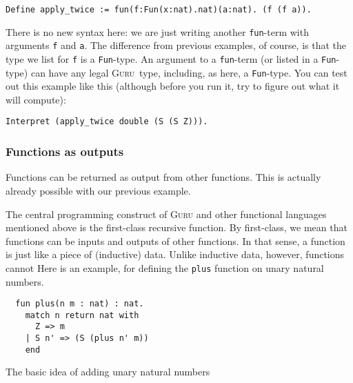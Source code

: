 \documentclass{book}[12pt]
\newcommand{\guru}[0]{\textsc{Guru}}
\begin{document}
\begin{verbatim}
Define apply_twice := fun(f:Fun(x:nat).nat)(a:nat). (f (f a)).
\end{verbatim}

\noindent There is no new syntax here: we are just writing another
\texttt{fun}-term with arguments \texttt{f} and \texttt{a}.  The
difference from previous examples, of course, is that the type we list
for \texttt{f} is a \texttt{Fun}-type.  An argument to a
\texttt{fun}-term (or listed in a \texttt{Fun}-type) can have any
legal \guru\ type, including, as here, a \texttt{Fun}-type. You can
test out this example like this (although before you run it, try to
figure out what it will compute):

\begin{verbatim}
Interpret (apply_twice double (S (S Z))).
\end{verbatim}

\subsubsection{Functions as outputs}

Functions can be returned as output from other functions.  This is
actually already possible with our previous example.  


The central programming construct of \textsc{Guru} and
other functional languages mentioned above is the first-class
recursive function.  By first-class, we mean that functions can be
inputs and outputs of other functions.  In that sense, a function is
just like a piece of (inductive) data.  Unlike inductive data,
however, functions cannot Here is an example, for defining the
\texttt{plus} function on unary natural numbers.

\begin{verbatim}
  fun plus(n m : nat) : nat.
    match n return nat with
      Z => m
    | S n' => (S (plus n' m))
    end
\end{verbatim}

\noindent The basic idea of adding unary natural numbers 
\end{document}
